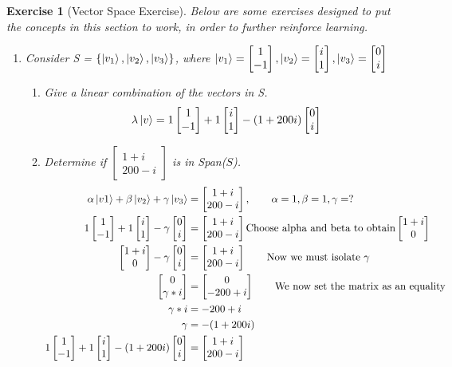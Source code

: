 \documentclass[12pt]{article}
\theoremstyle{plain}
\theoremstyle{nonumberplain}
\theoremstyle{plain}
\newtheorem{exercise}[lemma]{Exercise}
\theoremstyle{nonumberplain}
\newcommand\1{{\bf 1}}
\newcommand{\bmat}[1]{\begin{bmatrix*} #1 \end{bmatrix*}} %
\newcommand{\<}{\left\langle}
\renewcommand{\>}{\right\rangle}
\begin{document}
\begin{exercise}[Vector Space Exercise]
Below are some exercises designed to put the concepts in this section to work, in order to further reinforce learning.
\begin{enumerate}
\item Consider S = $\{\ket{v_1},\ket{v_2},\ket{v_3}\}$, where $\ket{v_1} = \bmat{1\\ -1}, \ket{v_2} = \bmat{i\\ 1}, \ket{v_3} = \bmat{0\\ i}$
	\begin{enumerate}
	\item Give a linear combination of the vectors in S.\\
	\begin{equation}
	\lambda\ket{v} = 1\bmat{1\\ -1} + 1\bmat{i\\ 1} - (1 + 200i)\bmat{0\\ i}
	\end{equation}
	\item Determine if $\bmat{1 + i\\ 200 - i}$ is in Span($S$).
	\begin{equation*}
	\begin{split}
		\alpha\ket{v1} + \beta\ket{v_2} + \gamma\ket{v_3} &= \bmat{1 + i\\ 200 - i},\qquad 	\alpha = 1, \beta = 1, \gamma = ?\\
		1\bmat{1\\ -1} + 1\bmat{i\\ 1} - \gamma\bmat{0\\ i} &= \bmat{1 + i\\ 200 - i}				\text{Choose alpha and beta to obtain} \bmat{1+i\\ 0}\\
		\bmat{1 + i\\ 0} - \gamma\bmat{0\\ i} &= \bmat{1 + i\\ 200 - i}\qquad \text{Now we must isolate $\gamma$}\\
		\bmat{0\\ \gamma*i} &= \bmat{0\\ -200 + i}\qquad \text{We now set the matrix as an equality}\\
		\gamma*i &= -200+i\\
		\gamma &= -(1 + 200i)\\
		1\bmat{1\\ -1} + 1\bmat{i\\ 1} - (1 + 200i)\bmat{0\\ i} &= \bmat{1 + i\\ 200 - i} 

\end{split}
\end{equation*}
\end{enumerate}
\end{enumerate}
\end{exercise}
\end{document}
